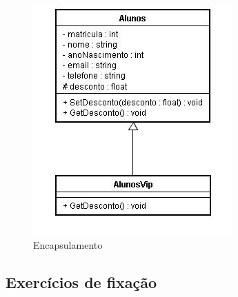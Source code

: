 \begin{figure}[H]
	\centering
	\includegraphics[scale=0.8]{imagens/DC_vip.jpg}
	\caption{Encapsulamento}
	\label{fig:encapsulamento}
\end{figure}

\subsection{Exercícios de fixação}


